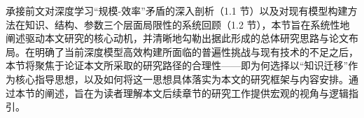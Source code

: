 \documentclass[../main.tex]{subfiles}
\begin{document}

\label{sec:research-motivation-and-overall-approach}

承接前文对深度学习“规模-效率”矛盾的深入剖析（1.1 节）以及对现有模型构建方法在知识、结构、参数三个层面局限性的系统回顾（1.2 节），本节旨在系统性地阐述驱动本文研究的核心动机，并清晰地勾勒出据此形成的总体研究思路与论文布局。在明确了当前深度模型高效构建所面临的普遍性挑战与现有技术的不足之后，本节将聚焦于论证本文所采取的研究路径的合理性——即为何选择以“知识迁移”作为核心指导思想，以及如何将这一思想具体落实为本文的研究框架与内容安排。通过本节的阐述，旨在为读者理解本文后续章节的研究工作提供宏观的视角与逻辑指引。
\end{document}
